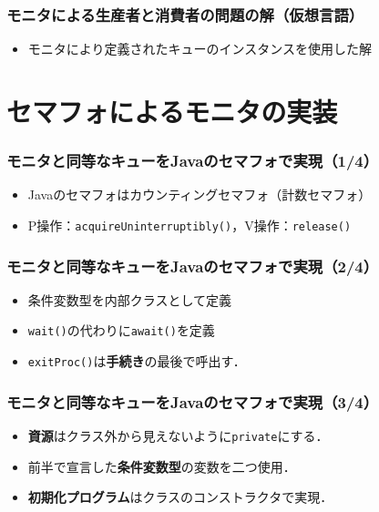 \documentclass[dvipdfmx]{beamer}
\begin{document}
\begin{frame}
  \frametitle{モニタによる生産者と消費者の問題の解（仮想言語）}
  

  \begin{itemize}
  \item モニタにより定義されたキューのインスタンスを使用した解
  \end{itemize}
\end{frame}

\section{セマフォによるモニタの実装}
\begin{frame}
  \frametitle{モニタと同等なキューをJavaのセマフォで実現（1/4）}
  

  \begin{itemize}
  \item Javaのセマフォはカウンティングセマフォ（計数セマフォ）
  \item P操作：{\tt acquireUninterruptibly()}，V操作：{\tt release()}
  \end{itemize}
\end{frame}

\begin{frame}
  \frametitle{モニタと同等なキューをJavaのセマフォで実現（2/4）}
  

  \begin{itemize}
  \item 条件変数型を内部クラスとして定義
  \item {\tt wait()}の代わりに{\tt await()}を定義
  \item {\tt exitProc()}は{\bf 手続き}の最後で呼出す．
  \end{itemize}
\end{frame}

\begin{frame}
  \frametitle{モニタと同等なキューをJavaのセマフォで実現（3/4）}
  

  \begin{itemize}
  \item {\bf 資源}はクラス外から見えないように{\tt private}にする．
  \item 前半で宣言した{\bf 条件変数型}の変数を二つ使用．
  \item {\bf 初期化プログラム}はクラスのコンストラクタで実現．
  \end{itemize}
\end{frame}
\end{document}
